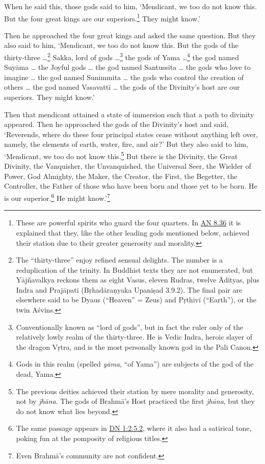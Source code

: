 \documentclass[12pt,openany]{book}%
\begin{document}
When he said this, those gods said to him, ‘Mendicant, we too do not know this. But the four great kings are our superiors.\footnote{These are powerful spirits who guard the four quarters. In \href{https://suttacentral.net/an8.36/en/sujato}{AN 8.36} it is explained that they, like the other leading gods mentioned below, achieved their station due to their greater generosity and morality. } They might know.’ 

Then he approached the four great kings and asked the same question. But they also said to him, ‘Mendicant, we too do not know this. But the gods of the thirty-three …\footnote{The “thirty-three” enjoy refined sensual delights. The number is a reduplication of the trinity. In Buddhist texts they are not enumerated, but \textsanskrit{Yājñavalkya} reckons them as eight Vasus, eleven Rudras, twelve Ādityas, plus Indra and \textsanskrit{Prajāpati} (\textsanskrit{Bṛhadāraṇyaka} \textsanskrit{Upaniṣad} 3.9.2). The final pair are elsewhere said to be Dyaus (“Heaven” = Zeus) and \textsanskrit{Pṛthivī} (“Earth”), or the twin \textsanskrit{Aśvins}. } Sakka, lord of gods …\footnote{Conventionally known as “lord of gods”, but in fact the ruler only of the relatively lowly realm of the thirty-three. He is Vedic Indra, heroic slayer of the dragon \textsanskrit{Vṛtra}, and is the most personally known god in the Pali Canon. } the gods of Yama …\footnote{Gods in this realm (spelled \textit{\textsanskrit{yāma}}, “of Yama”) are subjects of the god of the dead, Yama. } the god named \textsanskrit{Suyāma} … the Joyful gods … the god named Santussita … the gods who love to imagine … the god named Sunimmita … the gods who control the creation of others … the god named \textsanskrit{Vasavattī} … the gods of the Divinity’s host are our superiors. They might know.’ 

Then that mendicant attained a state of immersion such that a path to divinity appeared. Then he approached the gods of the Divinity’s host and said, ‘Reverends, where do these four principal states cease without anything left over, namely, the elements of earth, water, fire, and air?’ But they also said to him, ‘Mendicant, we too do not know this.\footnote{The previous deities achieved their station by mere morality and generosity, not by \textit{\textsanskrit{jhāna}}. The gods of \textsanskrit{Brahmā}’s Host practiced the first \textit{\textsanskrit{jhāna}}, but they do not know what lies beyond. } But there is the Divinity, the Great Divinity, the Vanquisher, the Unvanquished, the Universal Seer, the Wielder of Power, God Almighty, the Maker, the Creator, the First, the Begetter, the Controller, the Father of those who have been born and those yet to be born. He is our superior.\footnote{The same passage appears in \href{https://suttacentral.net/dn1/en/sujato\#2.5.2}{DN 1:2.5.2}, where it also had a satirical tone, poking fun at the pomposity of religious titles. } He might know.’\footnote{Even \textsanskrit{Brahmā}’s community are not confident. } 
\end{document}
